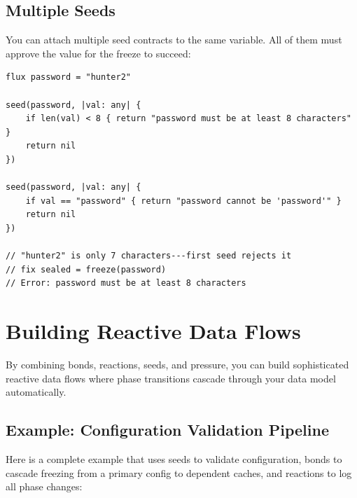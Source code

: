 \subsection{Multiple Seeds}

You can attach multiple seed contracts to the same variable.
All of them must approve the value for the freeze to succeed:

\begin{lstlisting}[language=Lattice, caption={Multiple seed contracts}]
flux password = "hunter2"

seed(password, |val: any| {
    if len(val) < 8 { return "password must be at least 8 characters" }
    return nil
})

seed(password, |val: any| {
    if val == "password" { return "password cannot be 'password'" }
    return nil
})

// "hunter2" is only 7 characters---first seed rejects it
// fix sealed = freeze(password)
// Error: password must be at least 8 characters
\end{lstlisting}

\section{Building Reactive Data Flows}\label{sec:reactive-data-flows}


By combining bonds, reactions, seeds, and pressure, you can build sophisticated reactive data flows where phase transitions cascade through your data model automatically.

\subsection{Example: Configuration Validation Pipeline}

Here is a complete example that uses seeds to validate configuration, bonds to cascade freezing from a primary config to dependent caches, and reactions to log all phase changes:

